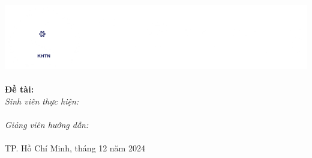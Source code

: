 \begin{titlepage}



\newcommand{\HRule}{\rule{\linewidth}{0.5mm}}

\includegraphics[scale=.15]{img/Logo-FIT.png}\\[1cm] 


{ 
\huge{\bfseries{\reporttitle}}\\[0.5cm]
\large{\bfseries{Đề tài: \reportname}}
}\\[0.4cm]

\emph{Sinh viên thực hiện:}\\
\studentname\\[1cm]

\emph{Giảng viên hướng dẫn:} \\
\teachername\\[3cm]

{\large TP. Hồ Chí Minh, tháng 12 năm 2024}

\vfill


\end{titlepage}
	